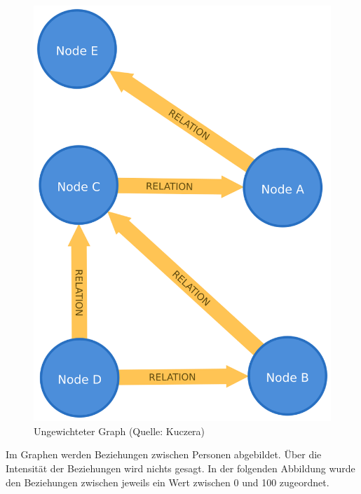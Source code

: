 \begin{figure}
\centering
\includegraphics{Bilder/unWeightedGraph.png}
\caption{Ungewichteter Graph (Quelle: Kuczera)}
\end{figure}

Im Graphen werden Beziehungen zwischen Personen abgebildet. Über die
Intensität der Beziehungen wird nichts gesagt. In der folgenden
Abbildung wurde den Beziehungen zwischen jeweils ein Wert zwischen 0 und
100 zugeordnet.

